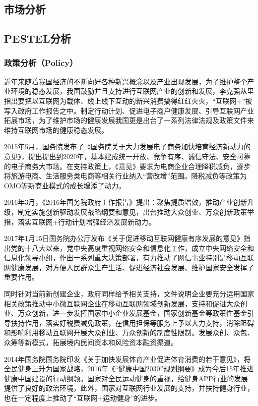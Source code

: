 \documentclass[UTF8,12pt]{ctexart}
\numberwithin{figure}{section}%
\begin{document}
\begin{spacing}{2}
\section{市场分析}
\subsection{PESTEL分析}
\subsubsection{政策分析（Policy）}
近年来随着我国经济的不断向好各种新兴概念以及产业出现发展，为了维护整个产业环境的稳态发展，我国鼓励并且支持进行互联网产业的创新和发展，李克强从里指出要把以互联网为载体、线上线下互动的新兴消费搞得红红火火，“互联网+”被写入政府工作报告之中。制定行动计划、促进电子商户健康发展、引导互联网产业拓展市场，为了维护市场的健康发展我国更是出台了一系列法律法规及政策文件来维持互联网市场的健康稳态发展。

2015年5月，国务院发布了《国务院关于大力发展电子商务加快培育经济新动力的意见》，提出提出到2020年，基本建成统一开放、竞争有序、诚信守法、安全可靠的电子商务大市场。在支持政策上，《意见》要求为电商企业合理降税减负，逐步将旅游电商、生活服务类电商等相关行业纳入“营改增”范围。降税减负等政策为OMO等新商业模式的成长增添了动力。 

2016年3月，《2016年国务院政府工作报告》提出：聚焦提质增效，推动产业创新升级，制定实施创新驱动发展战略纲要和意见，出台推动大众创业、万众创新政策举措，落实互联网+行动计划增强经济发展新动力。

2017年1月15日国务院办公厅发布《关于促进移动互联网健康有序发展的意见》指出党的十八大以来，党中央高度重视网络安全和信息化工作，成立中央网络安全和信息化领导小组，作出一系列重大决策部署，有力推动了网信事业特别是移动互联网健康发展，对方便人民群众生产生活、促进经济社会发展、维护国家安全发挥了重要作用。

同时针对当前新创建企业，政府同样给予相关支持，文件说明企业要充分运用国家相关政策推动中小微互联网企业在移动互联网领域创新发展，支持和促进大众创业、万众创新，进一步发挥国家中小企业发展基金，国家创新基金等政策性基金引导扶持作用，落实好税费减免政策，在信用担保等服务上予以大力支持，消除阻碍和影响利用移动互联网开展大众创业、万众创新的制度性限制。发展众创、众包、众筹等新模式，拓展境内民间资本和风险资本融资渠道。

2014年国务院国务院印发《关于加快发展体育产业促进体育消费的若干意见》，将全民健身上升为国家战略，2016年《“健康中国2030”规划纲要》成为今后15年推进健康中国建设的行动纲领。国家对全民运动健身的重视，给健身APP行业的发展提供了良好的政治环境，此外，国家对互联网行业发展的支持，并扶持健身行业，也在一定程度上推动了“互联网+运动健身”的进步。


\end{spacing}
\end{document}
